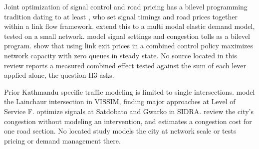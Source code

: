 Joint optimization of signal control and road pricing has a bilevel programming tradition dating
to at least \citet{smith1997}, who set signal timings and road prices together within a link flow
framework. \citet{clegg2001} extend this to a multi modal elastic demand model, tested on a small
network. \citet{mao2013} model signal settings and congestion tolls as a bilevel program.
\citet{smith2022} show that using link exit prices in a combined control policy maximizes network
capacity with zero queues in steady state. No source located in this review reports a measured
combined effect tested against the sum of each lever applied alone, the question H3 asks.

Prior Kathmandu specific traffic modeling is limited to single intersections. \citet{tamang2026}
model the Lainchaur intersection in VISSIM, finding major approaches at Level of Service F.
\citet{tiwari2024satdobato} optimize signals at Satdobato and Gwarko in SIDRA. \citet{luitel2025}
review the city's congestion without modeling an intervention, and \citet{bhatta2024} estimates a
congestion cost for one road section. No located study models the city at network scale or tests
pricing or demand management there.
